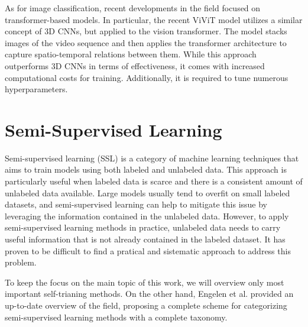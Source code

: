 As for image classification, recent developments in the field focused on 
transformer-based models. In particular, the recent ViViT model \cite{vivit} 
utilizes a similar concept of 3D CNNs, but applied to the vision transformer. 
The model stacks images of the video sequence and then applies the transformer 
architecture to capture spatio-temporal relations between them. 
While this approach outperforms 3D CNNs in terms of effectiveness, it comes with 
increased computational costs for training. Additionally, it is required to 
tune numerous hyperparameters.

\section{Semi-Supervised Learning}
Semi-supervised learning (SSL) is a category of machine learning techniques 
that aims to train models using both labeled and unlabeled data. This approach 
is particularly useful when labeled data is scarce and there is a consistent 
amount of unlabeled data available. Large models usually tend to overfit on 
small labeled datasets, and semi-supervised learning can help to mitigate this 
issue by leveraging the information contained in the unlabeled data.
However, to apply semi-supervised learning methods in practice, unlabeled data 
needs to carry useful information that is not already contained in the labeled 
dataset. It has proven to be difficult to find a pratical and sistematic 
approach to address this problem.

To keep the focus on the main topic of this work, we will overview only most 
important self-trianing methods. On the other hand, Engelen et al. 
\cite{ssl_survey} 
provided an up-to-date overview of the field, proposing a complete 
scheme for categorizing semi-supervised learning methods with a complete 
taxonomy.